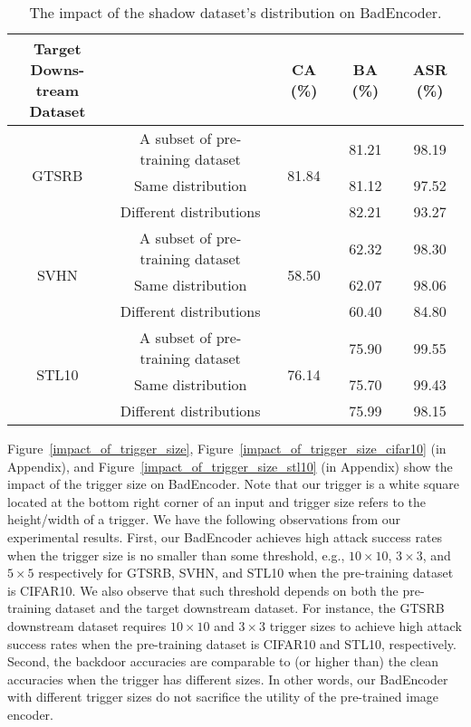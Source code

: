 \begin{table}[tp]\renewcommand{\arraystretch}{1.4} 
\setlength{\tabcolsep}{3pt}
	\centering
	\fontsize{7.5}{8}\selectfont
	\caption{The impact of the shadow dataset's distribution on  BadEncoder.} 
	\begin{tabular}{|c|c|c|c|c|}
		\hline
	 \makecell{Target Downs-\\tream Dataset}& \makecell{Shadow Dataset} & CA (\%) & BA (\%) & ASR (\%)   \\ \hline
    
	\multirow{3}{*}{GTSRB}
	&	A subset of pre-training dataset & \multirow{3}{*}{81.84} & 81.21 & 98.19  \\ \cline{2-2}\cline{4-5} 
	&	Same distribution & & 81.12 & 97.52  \\ \cline{2-2}\cline{4-5} 
	&	Different distributions & & 82.21 & 93.27  \\ \cline{1-3}\cline{4-5} 

	
	\multirow{3}{*}{SVHN}
	&		A subset of pre-training dataset  & \multirow{3}{*}{ 58.50} & 62.32 & 98.30  \\ \cline{2-2}\cline{4-5} 
	&	Same distribution &  & 62.07 & 98.06  \\ \cline{2-2}\cline{4-5} 
	& Different distributions &  & 60.40 & 84.80  \\ \cline{1-5} 

    \multirow{3}{*}{STL10}
	&		A subset of pre-training dataset  & \multirow{3}{*}{76.14} & 75.90 & 99.55  \\ \cline{2-2}\cline{4-5} 
	&	Same distribution &  & 75.70 & 99.43  \\ \cline{2-2}\cline{4-5} 
	& Different distributions & & 75.99 & 98.15  \\ \hline

	\end{tabular}
	\label{impact_of_attack_dist}
	\vspace{-4mm}
\end{table}

 Figure~\ref{impact_of_trigger_size},  Figure~\ref{impact_of_trigger_size_cifar10} (in Appendix), and Figure~\ref{impact_of_trigger_size_stl10} (in Appendix)  show the impact of the trigger size on BadEncoder. Note that our trigger is a white square located at the bottom right corner of an input and trigger size refers to the height/width of a trigger. We have the following observations from our experimental results. First, our BadEncoder achieves high attack success rates when the trigger size is no smaller than some threshold, e.g., $10 \times 10$, $3 \times 3$, and $5 \times 5$ respectively for GTSRB,  SVHN, and STL10 when the pre-training dataset is CIFAR10. We also observe that such threshold depends on both the pre-training dataset and the target downstream dataset. For instance, the GTSRB downstream dataset requires $10 \times 10$ and $3 \times 3$ trigger sizes to achieve high attack success rates when the pre-training dataset is CIFAR10 and STL10, respectively. 
Second, the backdoor accuracies are comparable to (or higher than) the clean accuracies when the trigger has different sizes. In other words, our BadEncoder with different trigger sizes do not sacrifice the utility of the pre-trained image encoder. 


